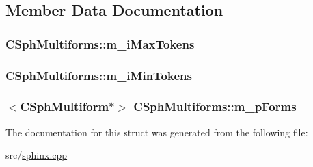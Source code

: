 \subsection{Member Data Documentation}
\hypertarget{structCSphMultiforms_aa9d8d09186e906243bf8fd2124740771}{
\subsubsection[{m\-\_\-i\-Max\-Tokens}]{ C\-Sph\-Multiforms\-::m\-\_\-i\-Max\-Tokens}}\label{structCSphMultiforms_aa9d8d09186e906243bf8fd2124740771}
\hypertarget{structCSphMultiforms_a6ff6b1a9bda83d2a8495568ac6c45008}{
\subsubsection[{m\-\_\-i\-Min\-Tokens}]{ C\-Sph\-Multiforms\-::m\-\_\-i\-Min\-Tokens}}\label{structCSphMultiforms_a6ff6b1a9bda83d2a8495568ac6c45008}
\hypertarget{structCSphMultiforms_af28f7b3e6a0d2f88f2636144d9e95554}{
\subsubsection[{m\-\_\-p\-Forms}]{$<${\bf C\-Sph\-Multiform}$\ast$$>$ C\-Sph\-Multiforms\-::m\-\_\-p\-Forms}}\label{structCSphMultiforms_af28f7b3e6a0d2f88f2636144d9e95554}


The documentation for this struct was generated from the following file\-:\begin{DoxyCompactItemize}
\item 
src/\hyperlink{sphinx_8cpp}{sphinx.\-cpp}\end{DoxyCompactItemize}
